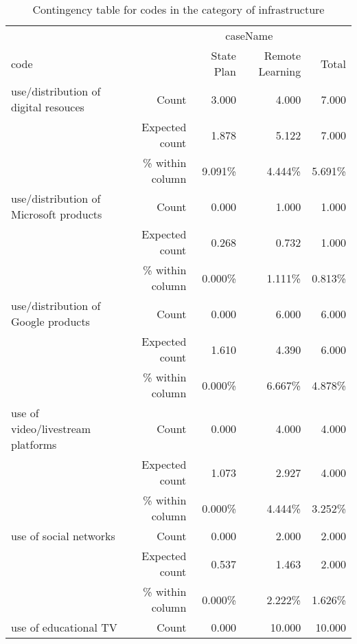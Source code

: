 \documentclass[6pt, oneside]{article}   	%
\begin{document}


\begin{table}[h]
	\centering
	\caption{Contingency table for codes in the category of infrastructure}
	\label{tab:contingencyTables}
	{
		\begin{tabular}{lrrrr}
			\toprule
			\multicolumn{1}{c}{} & \multicolumn{1}{c}{} & \multicolumn{2}{c}{caseName} & \multicolumn{1}{c}{} \\
			\cline{3-4}
			code &  & State Plan & Remote Learning & Total  \\
			\cmidrule[0.4pt]{1-5}
			use/distribution of digital resouces & Count & 3.000 & 4.000 & 7.000  \\
			 & Expected count & 1.878 & 5.122 & 7.000  \\
			 &  \% within column & 9.091\% & 4.444\% & 5.691\%  \\
			use/distribution of Microsoft products & Count & 0.000 & 1.000 & 1.000  \\
			 & Expected count & 0.268 & 0.732 & 1.000  \\
			 &  \% within column & 0.000\% & 1.111\% & 0.813\%  \\
			use/distribution of Google products & Count & 0.000 & 6.000 & 6.000  \\
			 & Expected count & 1.610 & 4.390 & 6.000  \\
			 &  \% within column & 0.000\% & 6.667\% & 4.878\%  \\
			use of video/livestream platforms & Count & 0.000 & 4.000 & 4.000  \\
			 & Expected count & 1.073 & 2.927 & 4.000  \\
			 &  \% within column & 0.000\% & 4.444\% & 3.252\%  \\
			use of social networks & Count & 0.000 & 2.000 & 2.000  \\
			 & Expected count & 0.537 & 1.463 & 2.000  \\
			 &  \% within column & 0.000\% & 2.222\% & 1.626\%  \\
			use of educational TV & Count & 0.000 & 10.000 & 10.000  \\

\end{tabular}}
\end{table}
\end{document}
